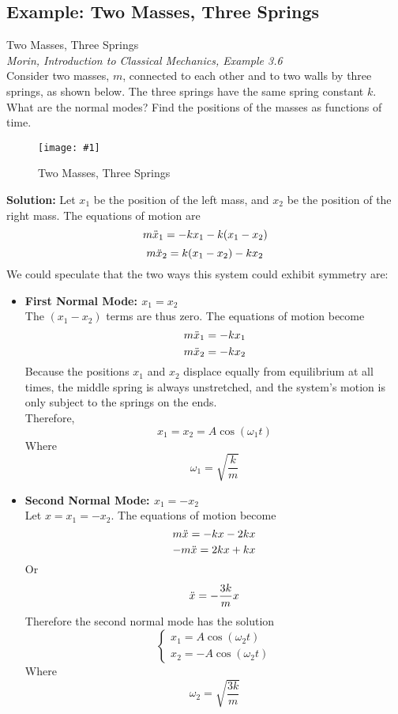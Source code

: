 \documentclass[11pt]{article}
\newcommand{\fig}[4]{
    \begin{figure}[H]
        \centering
        \texttt{[image: \#1]}
        \caption{#2}
        \label{exp4fit}
    \end{figure}
}
\theoremstyle{gangnamstyle}{\newtheorem{definition}{Definition}[]}
\theoremstyle{gangnamstyle}{\newtheorem{example}{Example}[]}
\theoremstyle{gangnamstyle}{\newtheorem{problem}{Problem}[]}
\theoremstyle{gangnamstyle}{\newtheorem{warning}{Warning}[]}
\begin{document}
\subsection{Example: Two Masses, Three Springs}
\begin{example}
Two Masses, Three Springs \\
\textit{Morin, Introduction to Classical Mechanics, Example 3.6} \\
Consider two masses, $m$, connected to each other and to two walls by three springs, as shown below. The three springs have the same spring constant $k$. What are the normal modes? Find the positions of the masses as functions of time. 
\fig{figs/n3/twomasswall.jpg}{Two Masses, Three Springs}{0.75}{0}

\textbf{Solution:} Let $x_1$ be the position of the left mass, and $x_2$ be the position of the right mass. The equations of motion are
\[ m\Ddot{x}_1 = -kx_1 - k(x_1 - x_2) \]
\[ m\Ddot{x}_2 = k(x_1 - x_2) - kx_2 \]
We could speculate that the two ways this system could exhibit symmetry are: 
\begin{itemize}
\item \textbf{First Normal Mode: $x_1 = x_2$} \\
The $(x_1 - x_2)$ terms are thus zero. The equations of motion become
\[  m\Ddot{x}_1 = -kx_1 \]
\[  m\Ddot{x}_2 = -kx_2 \]
Because the positions $x_1$ and $x_2$ displace equally from equilibrium at all times, the middle spring is always unstretched, and the system's motion is only subject to the springs on the ends. \\
Therefore, 
\[ x_1 = x_2 = A\cos(\omega_1 t) \]
Where 
\[ \omega_1 = \sqrt{\frac{k}{m}} \]

\item \textbf{Second Normal Mode: $x_1 = -x_2$} \\
Let $x = x_1 = -x_2$. The equations of motion become
\[ m\Ddot{x} = -kx - 2kx \]
\[ -m\Ddot{x} = 2kx + kx \]
Or
\[ \Ddot{x} = -\frac{3k}{m}x \]
Therefore the second normal mode has the solution
\[ \begin{cases}
x_1 = A\cos(\omega_2 t) \\
x_2 = - A\cos(\omega_2 t)
\end{cases} \]
Where
\[ \omega_2 = \sqrt{\frac{3k}{m}} \]
\end{itemize}
\end{example}
\end{document}

